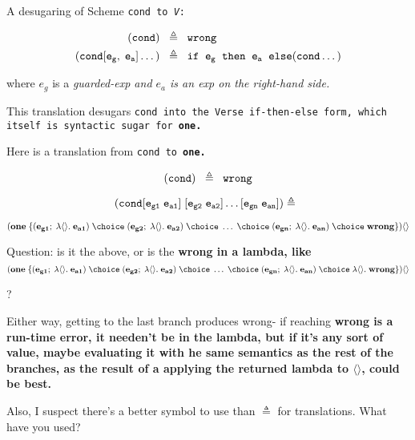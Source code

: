 \documentclass[]{article}
\begin{document}
A desugaring of Scheme \tt{cond} to \textit{V}: 

\begin{align*}
\tt{(cond)} \;\; & \triangleq \;\; \tt{wrong} \\
\tt{(cond [} e_g, \; e_a \tt{] \dots)} \;\; 
& \triangleq \;\; \tt{if} \;\; e_g  \;\; \tt{then} \;\; e_a \;\; 
  \tt{else (cond \dots)} \\
\end{align*}

where $e_g$ is a \it{guarded-exp} and $e_a$ is an \it{exp} on the 
right-hand side. 

This translation desugars \tt{cond} into the Verse \tt{if-then-else} form, 
which itself is syntactic sugar for \bf{one}. 

\medskip

Here is a translation from \tt{cond} to \bf{one}. 

$$ \tt{(cond)} \;\;  \triangleq \;\; \tt{wrong} $$

$$ \tt{(cond [} e_{g1} \; e_{a1}\tt{]} \; \tt{[}e_{g2} \; e_{a2} \tt{] \dots [}e_{gn} \; e_{an}\tt{] )}
  \triangleq \;\; 
$$

$$ (\bf{one} \; \{(e_{g1} ; \; \lambda\langle\rangle.\; e_{a1}) \; \choice \; 
(e_{g2} ; \;\lambda\langle\rangle.\; e_{a2}) \; \choice \; \dots \; \choice \; 
(e_{gn} ; \;\lambda\langle\rangle.\; e_{an}) \; 
\choice \; \bf{wrong} \})\langle\rangle  \\
$$  

Question: is it the above, or is the \bf{wrong} in a lambda, like
$$
(\bf{one} \; \{(e_{g1} ; \; \lambda\langle\rangle.\; e_{a1}) \; \choice \; 
(e_{g2} ; \;\lambda\langle\rangle.\; e_{a2}) \; \choice \; \dots \; \choice \; (e_{gn} ; \;\lambda\langle\rangle.\; e_{an}) \; 
\choice \; \lambda\langle\rangle.\;\bf{wrong} \})\langle\rangle  \\
$$  

? 

Either way, getting to the last branch produces wrong- if reaching \bf{wrong} is
a run-time error, it needen't be in the lambda, but if it's any sort of value, 
maybe evaluating it with he same semantics as the rest of the branches, as the 
result of a applying the returned lambda to $\langle\rangle$, could be best. 

\bigskip
Also, I suspect there's a better symbol to use than $\triangleq$ for 
translations. What have you used? 

\end{document}
